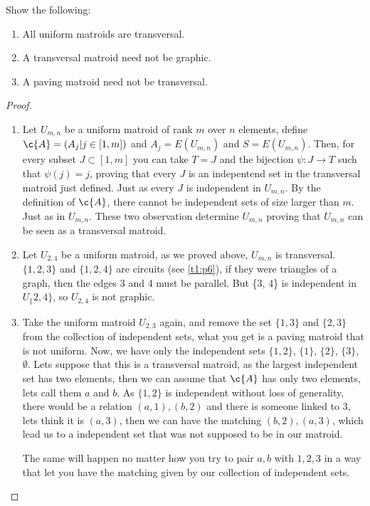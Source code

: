 \prob
{
    Show the following:
    \begin{enumerate}[label=(\roman*)]
        \item   All uniform matroids are transversal.
        \item   A transversal matroid need not be graphic.
        \item   A paving matroid need not be transversal.
    \end{enumerate}
}
\begin{proof}
    \begin{enumerate}[label=(\roman*)]
        \item   Let $U_{m, n}$ be a uniform matroid of rank $m$ over $n$ elements,  define $\c{A} = (A_j | j \in [1, m])$ 
                and $A_j = E(U_{m,n})$ and $S = E(U_{m,n})$. Then, for every subset $J \subset [1, m]$ you can take $T = J$ and the bijection
                $\psi : J \rightarrow T$ such that $\psi(j) = j$, proving that every $J$ is an indepentend set in the transversal
                matroid just defined. Just as every $J$ is independent in $U_{m, n}$. By the definition of $\c{A}$, there cannot be
                independent sets of size larger than $m$. Just as in $U_{m, n}$. These two observation determine $U_{m, n}$ proving that
                $U_{m, n}$ can be seen as a transversal matroid.\pn
                
        \item   Let $U_{2, 4}$ be a uniform matroid, as we proved above, $U_{m, n}$ is transversal. $\{1, 2, 3\}$ and $\{1, 2, 4\}$ are circuits
                (see \ref{t1:p6}), if they were triangles of a graph, then the edges 3 and 4 must be parallel. But \{3, 4\} is independent in $U_\{2, 4\}$,
                so $U_{2, 4}$ is not graphic.\pn

        \item   Take the uniform matroid $U_{2, 3}$ again, and remove the set $\{1, 3\}$ and $\{2, 3\}$ from the collection of independent sets, what you
                get is a paving matroid that is not uniform. Now, we have only the independent sets $\{1, 2\}$, $\{1\}$, $\{2\}$, $\{3\}$, $\emptyset$.
                Lets suppose that this is a transversal matroid, as the largest independent set has two elements, then we can assume that $\c\{A\}$ has only 
                two elements, lets call them $a$ and $b$. As $\{1, 2\}$ is independent without loss of generality, there would be a relation $(a, 1), (b, 2)$ 
                and there is someone linked to $3$, lets think it is $(a, 3)$, then we can have the matching $(b,2), (a,3)$, which lead us to a independent set
                that was not supposed to be in our matroid.\pn
                
                The same will happen no matter how you try to pair $a, b$ with $1, 2, 3$ in a way that let you have the matching given by our collection
                of independent sets.\pn
                
    \end{enumerate}
\end{proof}